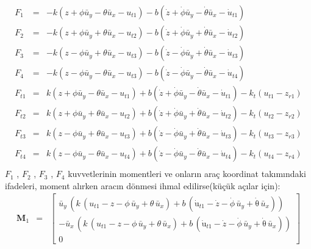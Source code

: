 \documentclass[a4paper]{report}
\begin{document}
\begin{eqnarray*}
F_1 &=& -k\left(z +\phi \bar{u}_{y} - \theta \bar{u}_{x} - u_{t1}\right)-b \left(\dot{z} +\dot{\phi} \bar{u}_{y} - \dot{\theta} \bar{u}_{x} -\dot{u}_{t1}\right)\\
F_2 &=& -k\left(z +\phi \bar{u}_{y} + \theta \bar{u}_{x} - u_{t2}\right)-b \left(\dot{z} +\dot{\phi} \bar{u}_{y} + \dot{\theta} \bar{u}_{x}-\dot{u}_{t2}\right)\\
F_3 &=& -k\left(z -\phi \bar{u}_{y} + \theta \bar{u}_{x} - u_{t3}\right)-b \left(\dot{z} -\dot{\phi} \bar{u}_{y} + \dot{\theta} \bar{u}_{x}-\dot{u}_{t3}\right)\\
F_4 &=& -k\left(z -\phi \bar{u}_{y} - \theta \bar{u}_{x} - u_{t3}\right)-b \left(\dot{z} -\dot{\phi} \bar{u}_{y} - \dot{\theta} \bar{u}_{x}-\dot{u}_{t4}\right)\\
F_{t1} &=& k\left(z +\phi \bar{u}_{y} - \theta \bar{u}_{x} - u_{t1}\right)+b \left(\dot{z} +\dot{\phi} \bar{u}_{y} - \dot{\theta} \bar{u}_{x}-\dot{u}_{t1}\right) - k_t \left(u_{t1}-z_{r1}\right)\\
F_{t2} &=& k\left(z +\phi \bar{u}_{y} + \theta \bar{u}_{x} - u_{t2}\right)+b \left(\dot{z} +\dot{\phi} \bar{u}_{y} + \dot{\theta} \bar{u}_{x}-\dot{u}_{t2}\right) - k_t \left(u_{t2}-z_{r2}\right)\\
F_{t3} &=& k\left(z -\phi \bar{u}_{y} + \theta \bar{u}_{x} - u_{t3}\right)+b \left(\dot{z} -\dot{\phi} \bar{u}_{y} + \dot{\theta} \bar{u}_{x}-\dot{u}_{t3}\right) - k_t \left(u_{t3}-z_{r3}\right)\\
F_{t4} &=& k\left(z -\phi \bar{u}_{y} - \theta \bar{u}_{x} - u_{t4}\right)+b \left(\dot{z} -\dot{\phi} \bar{u}_{y} - \dot{\theta} \bar{u}_{x}-\dot{u}_{t4}\right) - k_t \left(u_{t4}-z_{r4}\right)\\
\end{eqnarray*}
$F_1$ , $F_2$ , $F_3$ , $F_4$ kuvvetlerinin momentleri ve onların araç koordinat takımındaki ifadeleri, moment alırken aracın dönmesi ihmal edilirse(küçük açılar için):
\begin{eqnarray*}
\mathbf{M}_1&=&\left[\begin{array}{c}
 \bar{u}_{y}\, \left(k\, \left(u_{t1} - z - \phi\, \bar{u}_{y} + \theta\, \bar{u}_{x}\right) + b \, \left(\mathrm{\dot{u}}_{t1} - \dot{z} - \dot{\phi}\, \bar{u}_{y} + \mathrm{\dot{\theta}}\, \bar{u}_{x}\right)\right)
\\ 
-\bar{u}_{x}\, \left(k\, \left(u_{t1} - z - \phi\, \bar{u}_{y} + \theta\, \bar{u}_{x}\right) + b \, \left(\mathrm{\dot{u}}_{t1} - \dot{z} - \dot{\phi}\, \bar{u}_{y} + \mathrm{\dot{\theta}}\, \bar{u}_{x}\right)\right)
\\
 0 \end{array} \right]
\end{eqnarray*}
\end{document}
